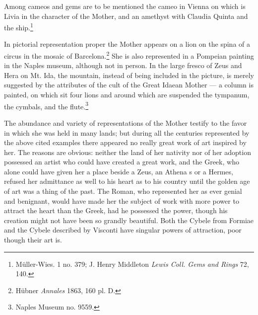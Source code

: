 \documentclass[a4paper, 11pt, oneside, polutonikogreek, french]{article}
\begin{document}
Among cameos and gems are to be mentioned the cameo in Vienna on which is Livia in the character of the Mother, and an amethyst with Claudia Quinta and the ship.\footnote{Müller-Wies. 1 no. 379; J. Henry Middleton \emph{Lewis Coll. Gems and Rings} 72, 140.}

In pictorial representation proper the Mother appears on a lion on the spina of a circus in the mosaic of Barcelona.\footnote{Hübner \emph{Annales} 1863, 160 pl. D.} She is also represented in a Pompeian painting in the Naples museum, although not in person. In the large fresco of Zeus and Hera on Mt. Ida, the mountain, instead of being included in the picture, is merely suggested by the attributes of the cult of the Great Idaean Mother --- a column is painted, on which sit four lions and around which are suspended the tympanum, the cymbals, and the flute.\footnote{Naples Museum no. 9559.}

The abundance and variety of representations of the Mother testify to the favor in which she was held in many lands; but during all the centuries represented by the above cited examples there appeared no really great work of art inspired by her. The reasons are obvious: neither the land of her nativity nor of her adoption possessed an artist who could have created a great work, and the Greek, who alone could have given her a place beside a Zeus, an Athena s or a Hermes, refused her admittance as well to his heart as to his country until the golden age of art was a thing of the past. The Roman, who represented her as ever genial and benignant, would have made her the subject of work with more power to attract the heart than the Greek, had he possessed the power, though his creation might not have been so grandly beautiful. Both the Cybele from Formiae and the Cybele described by Visconti have singular powers of attraction, poor though their art is.
\end{document}
